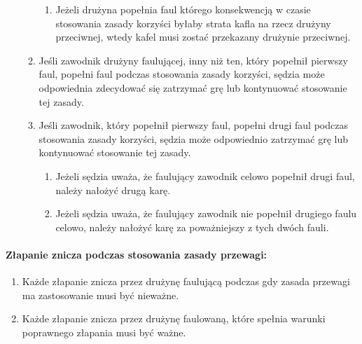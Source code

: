 \documentclass[12pt]{article}
\begin{document}
\begin{enumerate}
\begin{enumerate}
		            \begin{enumerate}
			            \item
			                  Jeżeli drużyna popełnia faul którego konsekwencją w czasie
			                  stosowania zasady korzyści byłaby strata kafla na rzecz drużyny
			                  przeciwnej, wtedy kafel musi zostać przekazany drużynie
			                  przeciwnej.
		            \end{enumerate}
		      \item
		            Jeśli zawodnik drużyny faulującej, inny niż ten, który popełnił
		            pierwszy faul, popełni faul podczas stosowania zasady korzyści,
		            sędzia może odpowiednia zdecydować się zatrzymać grę lub kontynuować
		            stosowanie tej zasady.
		      \item
		            Jeśli zawodnik, który popełnił pierwszy faul, popełni drugi faul
		            podczas stosowania zasady korzyści, sędzia może odpowiednio
		            zatrzymać grę lub kontynuować stosowanie tej zasady.

		            \begin{enumerate}
			            \item
			                  Jeżeli sędzia uważa, że faulujący zawodnik celowo popełnił drugi
			                  faul, należy nałożyć drugą karę.
			            \item
			                  Jeżeli sędzia uważa, że faulujący zawodnik nie popełnił drugiego
			                  faulu celowo, należy nałożyć karę za poważniejszy z tych dwóch
			                  fauli.
		            \end{enumerate}
	      \end{enumerate}
\end{enumerate}

\paragraph{Złapanie znicza podczas stosowania zasady przewagi:}

\begin{enumerate}
	\item
	      Każde złapanie znicza przez drużynę faulującą podczas gdy zasada
	      przewagi ma zastosowanie musi być nieważne.
	\item
	      Każde złapanie znicza przez drużynę faulowaną, które spełnia warunki
	      poprawnego złapania musi być ważne.
\end{enumerate}
\end{document}

